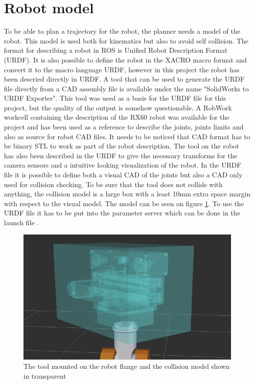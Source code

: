 \section{Robot model}
\label{sec:robot_model}
To be able to plan a trajectory for the robot, the planner needs a model of the robot. This model is used both for kinematics but also to avoid self collision. The format for describing a robot in ROS is Unified Robot Description Format (URDF). It is also possible to define the robot in the XACRO macro format and convert it to the macro language URDF, however in this project the robot has been descried directly in URDF.
A tool that can be used to generate the URDF file directly from a CAD assembly file is available under the name "SolidWorks to URDF Exporter". This tool was used as a basis for the URDF file for this project, but the quality of the output is somehow questionable. A RobWork workcell containing the description of the RX60 robot was available for the project and has been used as a reference to describe the joints, joints limits and also as source for robot CAD files. It needs to be noticed that CAD format has to be binary STL to work as part of the robot description. The tool on the robot has also been described in the URDF to give the necessary transforms for the camera sensors and a intuitive looking visualization of the robot. In the URDF file it is possible to define both a visual CAD of the joints but also a CAD only used for collision checking. To be sure that the tool does not collide with anything, the collision model is a large box with a least 10mm extra space margin with respect to the visual model. The model can be seen on figure \ref{fig:tool_collision_model}. To use the URDF file it has to be put into the parameter server which can be done in the launch file .

\begin{figure}[htb]
	\begin{center}
		\includegraphics[scale=0.5,trim=0 0 0 0]{graphics/05_robotics/tool_collision_model.png}%
		\caption{The tool mounted on the robot flange and the collision model shown in transparent}
		\label{fig:tool_collision_model}
	\end{center}
\end{figure}

